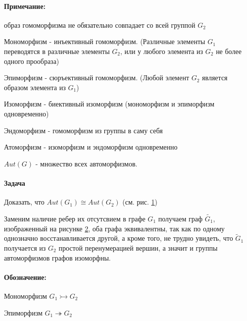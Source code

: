 \paragraph{Примечание:} образ гомоморфизма не обязательно совпадает со всей группой $G_2$

\begin{Def}
	Мономорфизм - инъективный гомоморфизм. (Различные элементы $G_1$ переводятся в различные элементы $G_2$, или у любого элемента из $G_2$ не более одного прообраза)
\end{Def}

\begin{Def}
	Эпиморфизм - сюръективный гомоморфизм. (Любой элемент $G_2$ является образом элемента из $G_1$)
\end{Def}

\begin{Def}
	Изоморфизм - биективный изоморфизм (мономорфизм и эпиморфизм одновременно)
\end{Def}

\begin{Def}
	Эндоморфизм - гомоморфизм из группы в саму себя
\end{Def}

\begin{Def}
	Атоморфизм - изоморфизм и эндоморфизм одновременно
\end{Def}

\begin{Def}
	$Aut(G)$ - множество всех автоморфизмов.
\end{Def}

\begin{figure}[h]
	\begin{minipage}[h]{0.4\linewidth}
		\noindent{}
	\end{minipage}
	\hfill
	\begin{minipage}[h]{0.4\linewidth}
		\noindent{}	\end{minipage}
	\label{pic::graphs}
\end{figure}

\paragraph{Задача} Доказать, что $Aut(G_1) \cong Aut(G_2)$ (см. рис. \ref{pic::graphs})

\begin{Solution}
\begin{figure}[h]
	\noindent{}
	\label{pic::tilde_graph}
\end{figure}

	Заменим наличие ребер их отсутсвием в графе $G_1$ получаем граф $\tilde {G_1}$, изображенный на рисунке \ref{pic::tilde_graph}, оба графа эквивалентны, так как по одному однозначно восстанавливается другой, а кроме того, не трудно увидеть, что $\tilde G_1$ получается из $G_2$ простой перенумерацией вершин, а значит и группы автоморфизмов графов изоморфны.
\end{Solution}

\paragraph{Обозначение:}
Мономорфизм $G_1 \rightarrowtail G_2$

Эпиморфизм $G_1 \twoheadrightarrow G_2$
